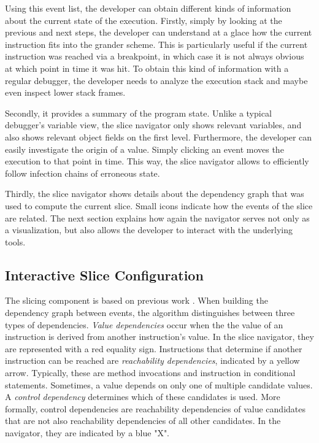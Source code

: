 ﻿\documentclass[
      english,
      ]{llncs}
\begin{document}
Using this event list, the developer can obtain different kinds of information about the current state of the execution.
Firstly, simply by looking at the previous and next steps, the developer can understand at a glace how the current instruction fits into the grander scheme.
This is particularly useful if the current instruction was reached via a breakpoint, in which case it is not always obvious at which point in time it was hit.
To obtain this kind of information with a regular debugger, the developer needs to analyze the execution stack and maybe even inspect lower stack frames.

Secondly, it provides a summary of the program state.
Unlike a typical debugger's variable view, the slice navigator only shows relevant variables, and also shows relevant object fields on the first level.
Furthermore, the developer can easily investigate the origin of a value.
Simply clicking an event moves the execution to that point in time.
This way, the slice navigator allows to efficiently follow infection chains of erroneous state.

Thirdly, the slice navigator shows details about the dependency graph that was used to compute the current slice.
Small icons indicate how the events of the slice are related.
The next section explains how again the navigator serves not only as a visualization, but also allows the developer to interact with the underlying tools.

\subsection{Interactive Slice Configuration}

The slicing component is based on previous work \todo{[xxx]}.
When building the dependency graph between events, the algorithm distinguishes between three types of dependencies.
\emph{Value dependencies} occur when the the value of an instruction is derived from another instruction's value.
In the slice navigator, they are represented with a red equality sign.
Instructions that determine if another instruction can be reached are \emph{reachability dependencies}, indicated by a yellow arrow.
Typically, these are method invocations and instruction in conditional statements.
Sometimes, a value depends on only one of multiple candidate values. 
A \emph{control dependency} determines which of these candidates is used.
More formally, control dependencies are reachability dependencies of value candidates that are not also reachability dependencies of all other candidates.
In the navigator, they are indicated by a blue "X".
\end{document}
